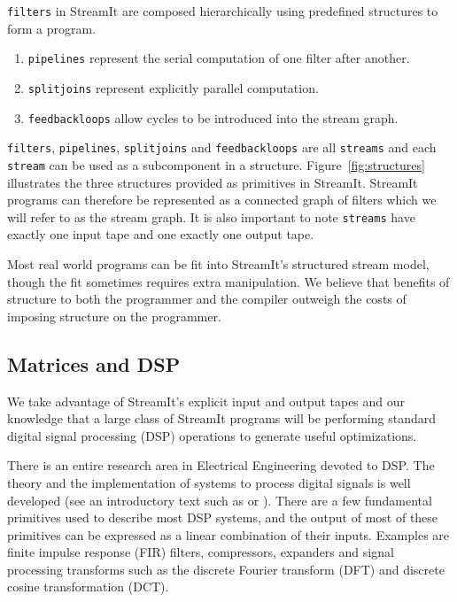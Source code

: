 {\tt filters} in StreamIt are composed hierarchically using predefined structures to form
a program. 

\begin{enumerate}
\item {\tt pipelines} represent the serial computation of one filter after another.
\item {\tt splitjoins} represent explicitly parallel computation. 
\item {\tt feedbackloops} allow cycles to be introduced into the stream graph. 
\end{enumerate}

{\tt filters}, {\tt pipelines}, {\tt splitjoins} and {\tt feedbackloops} 
are all {\tt streams} and each {\tt stream} can be used as a subcomponent in 
a structure. Figure~\ref{fig:structures} illustrates the three structures 
provided as primitives in StreamIt.
StreamIt programs can therefore be represented as a connected graph of filters 
which we will refer to as the stream graph. It is also important to note
{\tt streams} have exactly one input tape and one exactly one output tape.

Most real world programs can be fit into StreamIt's structured stream model, 
though the fit sometimes requires extra manipulation. We believe
that benefits of structure to both the programmer and the compiler outweigh the
costs of imposing structure on the programmer.




\subsection{Matrices and DSP}
We take advantage of StreamIt's explicit input and output tapes and
our knowledge that a large class of StreamIt programs will be performing
standard digital signal processing (DSP) operations to generate useful
optimizations.

There is an entire research area in Electrical Engineering devoted to DSP. The
theory and the implementation of systems to process digital signals is well developed (see
an introductory text such as\cite{oppenheim-discrete} or \cite{lyons-understanding}). 
There are a few fundamental primitives used to describe most DSP systems, and the output of 
most of these primitives can be expressed as a linear combination of their inputs. Examples are
finite impulse response (FIR) filters, compressors, expanders and signal processing transforms
such as the discrete Fourier transform (DFT) and discrete cosine transformation (DCT).

